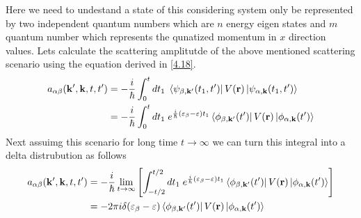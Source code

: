 \noindent
Here we need to undestand a state of this considering system only be represented by two independent quantum numbers which are $n$ energy eigen
states and $m$ quantum number which represents the qunatized momentum in $x$ direction values. Lets calculate the scattering amplitutde of the above mentioned scattering scenario using the equation derived in \eqref{4.18}.
\begin{equation} \label{4.21}
  \begin{aligned}
    a_{\alpha\beta}(\mathbf{k'},\mathbf{k},t,t') & =
    -
    \frac{i}{\hbar}
    \int_{0}^t dt_1 \;
    \bra{\psi_{\beta,\mathbf{k'}}(t_1,t')}
    V(\mathbf{r}) \ket{\psi_{\alpha,\mathbf{k}}(t_1,t')} \\
    & =
    -
    \frac{i}{\hbar}
    \int_{0}^t dt_1 \;
    e^{\frac{i}{\hbar}\qty(\varepsilon_{\beta} - \varepsilon)t_1}
    \bra{\phi_{\beta,\mathbf{k'}}(t')}
    V(\mathbf{r}) \ket{\phi_{\alpha,\mathbf{k}}(t')}
  \end{aligned}
\end{equation}
Next assuimg this scenario for long time $t \rightarrow \infty$ we can turn this integral into a delta distrubution as follows
\begin{equation} \label{4.22}
  \begin{aligned}
    a_{\alpha\beta}(\mathbf{k'},\mathbf{k},t,t') & =
    -
    \frac{i}{\hbar}
    \lim_{t \rightarrow \infty}\qty[
      \int_{-t/2}^{t/2} dt_1 \;
      e^{\frac{i}{\hbar}\qty(\varepsilon_{\beta} - \varepsilon)t_1}
      \bra{\phi_{\beta,\mathbf{k'}}(t')}
      V(\mathbf{r}) \ket{\phi_{\alpha,\mathbf{k}}(t')}
    ] \\
    & =
    -2\pi i \delta(\varepsilon_{\beta} - \varepsilon)
    \bra{\phi_{\beta,\mathbf{k'}}(t')}
    V(\mathbf{r}) \ket{\phi_{\alpha,\mathbf{k}}(t')}
  \end{aligned}
\end{equation}

